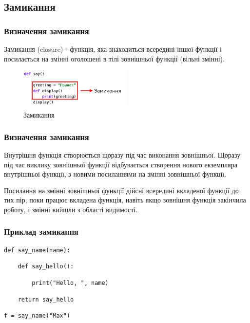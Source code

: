 \subsection{Замикання} 
\begin{frame}
\frametitle{Визначення замикання}
Замикання (closure) - функція, яка знаходиться всередині іншої функції і посилається на змінні оголошені в тілі зовнішньої функції (вільні змінні).
\begin{figure}
  \begin{center}
    \includegraphics[width=0.5\textwidth,height=0.35\textheight]{pictures/closure.png}
  \caption{Замикання}
\label{function}
  \end{center}
\end{figure}

\end{frame}

\begin{frame}
\frametitle{Визначення замикання}


Внутрішня функція створюється щоразу під час виконання зовнішньої. Щоразу під час виклику зовнішньої функції відбувається створення нового екземпляра внутрішньої функції, з новими посиланнями на змінні зовнішньої функції.

Посилання на змінні зовнішньої функції дійсні всередині вкладеної функції до тих пір, поки працює вкладена функція, навіть якщо зовнішня функція закінчила роботу, і змінні вийшли з області видимості.
\end{frame}

\begin{frame}
\frametitle{Приклад замикання}
\large{
\texttt{def say\_name(name):}
 
\texttt{~~~~def say\_hello():}

\texttt{~~~~~~~~print("Hello, ", name)}

\texttt{~~~~return say\_hello}

\texttt{f = say\_name("Max")}
}
\normalsize
\end{frame}


